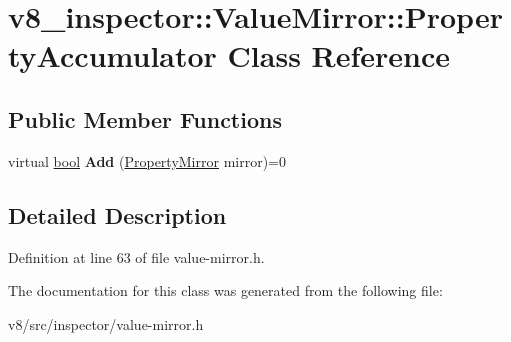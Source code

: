 \hypertarget{classv8__inspector_1_1ValueMirror_1_1PropertyAccumulator}{}\section{v8\+\_\+inspector\+:\+:Value\+Mirror\+:\+:Property\+Accumulator Class Reference}
\label{classv8__inspector_1_1ValueMirror_1_1PropertyAccumulator}
\subsection*{Public Member Functions}
\begin{DoxyCompactItemize}
\item 
\mbox{\label{classv8__inspector_1_1ValueMirror_1_1PropertyAccumulator_a076f550df4695d99a8c41619aedf931f}} 
virtual \mbox{\hyperlink{classbool}{bool}} {\bfseries Add} (\mbox{\hyperlink{structv8__inspector_1_1PropertyMirror}{Property\+Mirror}} mirror)=0
\end{DoxyCompactItemize}


\subsection{Detailed Description}


Definition at line 63 of file value-\/mirror.\+h.



The documentation for this class was generated from the following file\+:\begin{DoxyCompactItemize}
\item 
v8/src/inspector/value-\/mirror.\+h\end{DoxyCompactItemize}
